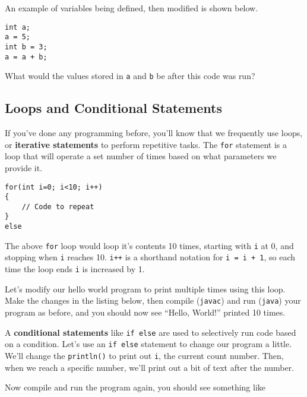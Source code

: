 	An example of variables being defined, then modified is shown below.
	
	\begin{lstlisting}[style=Java, numbers=none]
int a;
a = 5;
int b = 3;
a = a + b;
	\end{lstlisting}
	
	What would the values stored in \texttt{a} and \texttt{b} be after this code was run?	
	
	\subsection{Loops and Conditional Statements}
	
		If you've done any programming before, you'll know that we frequently use loops, or \textbf{iterative statements} to perform repetitive tasks. The \texttt{for} statement is a loop that will operate a set number of times based on what parameters we provide it.
		
		\begin{lstlisting}[style=Java, firstnumber=5]
for(int i=0; i<10; i++)
{
	// Code to repeat
}
else
		\end{lstlisting}
	
		The above \texttt{for} loop would loop it's contents 10 times, starting with \texttt{i} at 0, and stopping when \texttt{i} reaches 10. \texttt{i++} is a shorthand notation for \texttt{i = i + 1}, so each time the loop ends \texttt{i} is increased by 1.
		
		Let's modify our hello world program to print multiple times using this loop. Make the changes in the listing below, then compile (\texttt{javac}) and run (\texttt{java}) your program as before, and you should now see ``Hello, World!'' printed 10 times.
		
		
		
		A \textbf{conditional statements} like \texttt{if else} are used to selectively run code based on a condition. Let's use an \texttt{if else} statement to change our program a little. We'll change the \texttt{println()} to print out \texttt{i}, the current count number. Then, when we reach a specific number, we'll print out a bit of text after the number.
		
		
		
		Now compile and run the program again, you should see something like
		
